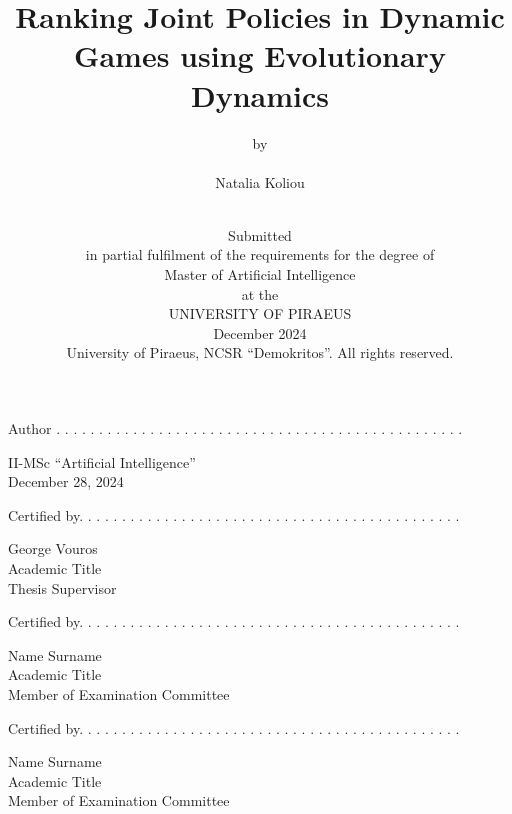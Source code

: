 \documentclass[12pt]{article}
\title{Ranking Joint Policies in Dynamic Games using Evolutionary Dynamics}
\author{by  \\~\\ \Large{Natalia Koliou} \\~\\}
\date{Submitted \\[14pt]
      in partial fulfilment of the requirements for the degree of \\[14pt]
      Master of Artificial Intelligence \\[14pt]
      at the \\[14pt]
      UNIVERSITY OF PIRAEUS \\[20pt]
      December 2024 \\[40pt]
      \footnotesize{University of Piraeus, NCSR “Demokritos”. All rights reserved.} }
\begin{document}
\begin{figure}
\end{figure}

\maketitle
\thispagestyle{empty}
\newpage

Author . . . . . . . . . . . . . . . . . . . . . . . . . . . . . . . . . . . . . . . . . . . . . . . .\\
\begin{flushright}
    II-MSc “Artificial Intelligence” \\ December 28, 2024 \\[4\baselineskip]
\end{flushright}

Certified by. . . . . . . . . . . . . . . . . . . . . . . . . . . . . . . . . . . . . . . . . . . . .

\begin{flushright}
    George Vouros \\ 
    Academic Title \\
    Thesis Supervisor \\[6\baselineskip]
\end{flushright}

Certified by. . . . . . . . . . . . . . . . . . . . . . . . . . . . . . . . . . . . . . . . . . . . .

\begin{flushright}
    Name Surname \\ 
    Academic Title \\
    Member of  Examination Committee \\[6\baselineskip]
\end{flushright}

Certified by. . . . . . . . . . . . . . . . . . . . . . . . . . . . . . . . . . . . . . . . . . . . .
\begin{flushright}
    Name Surname \\ 
    Academic Title \\
    Member of  Examination Committee
\end{flushright}
\end{document}
